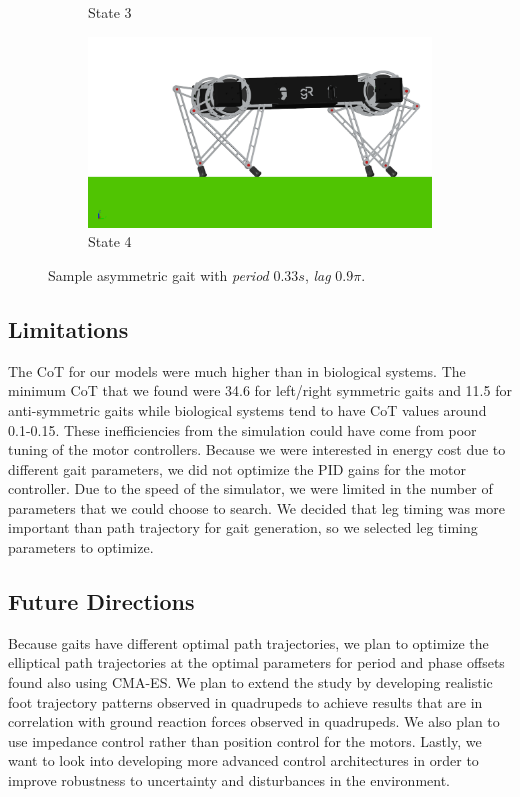 \documentclass[conference,11pt,letterpaper]{IEEEtran}
\begin{document}
\begin{figure}[t!]
\begin{subfigure}[t]{0.45\linewidth}
        \caption{State 3}
    \end{subfigure}%
    \begin{subfigure}[t]{0.45\linewidth}
        \includegraphics[width=\textwidth]{asymm_snap4}
        \caption{State 4}
    \end{subfigure}%
    \caption{Sample asymmetric gait with \emph{period} $0.33 s$, \emph{lag} $0.9\pi$.}
    \label{fig:asym_gait}
\end{figure}

\subsection{Limitations}
The CoT for our models were much higher than in biological systems. The minimum CoT that we found were 34.6 for left/right symmetric gaits and 11.5 for anti-symmetric gaits while biological systems tend to have CoT values around 0.1-0.15. These inefficiencies from the simulation could have come from poor tuning of the motor controllers. Because we were interested in energy cost due to different gait parameters, we did not optimize the PID gains for the motor controller. Due to the speed of the simulator, we were limited in the number of parameters that we could choose to search. We decided that leg timing was more important than path trajectory for gait generation, so we selected leg timing parameters to optimize. 

\subsection{Future Directions}
Because gaits have different optimal path trajectories, we plan to optimize the elliptical path trajectories at the optimal parameters for period and phase offsets found also using CMA-ES.
We plan to extend the study by developing realistic foot trajectory patterns observed in quadrupeds to achieve results that are in correlation with ground reaction forces observed in quadrupeds. We also plan to use impedance control rather than position control for the motors. Lastly, we want to look into developing more advanced control architectures in order to improve robustness to uncertainty and disturbances in the environment. 
\end{document}
